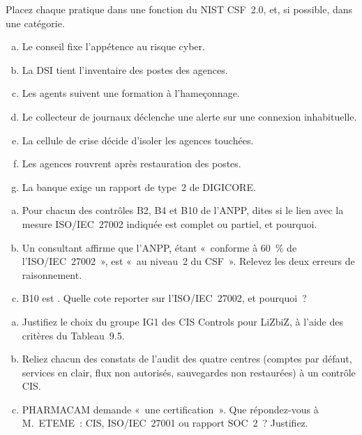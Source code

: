 \begin{boxexo}[title={\ding{45}\quad Exercice~9.1. Quelle fonction du CSF~? \niveaubase}]
Placez chaque pratique dans une fonction du NIST CSF~2.0, et, si possible,
dans une catégorie.
\begin{enumerate}[(a)]
    \item Le conseil fixe l'appétence au risque cyber.
    \item La DSI tient l'inventaire des postes des agences.
    \item Les agents suivent une formation à l'hameçonnage.
    \item Le collecteur de journaux déclenche une alerte sur une connexion
          inhabituelle.
    \item La cellule de crise décide d'isoler les agences touchées.
    \item Les agences rouvrent après restauration des postes.
    \item La banque exige un rapport de type~2 de DIGICORE.
\end{enumerate}
\end{boxexo}

\begin{boxexo}[title={\ding{45}\quad Exercice~9.2. Correspondances partielles \niveaumoyen}]
\begin{enumerate}[(a)]
    \item Pour chacun des contrôles B2, B4 et B10 de l'ANPP, dites si le lien
          avec la mesure ISO/IEC~27002 indiquée est complet ou partiel, et
          pourquoi.
    \item Un consultant affirme que l'ANPP, étant «~conforme à 60~\% de
          l'ISO/IEC~27002~», est «~au niveau~2 du CSF~». Relevez les deux
          erreurs de raisonnement.
    \item B10 est \OUI{}. Quelle cote reporter sur l'ISO/IEC~27002, et
          pourquoi~?
\end{enumerate}
\end{boxexo}

\begin{boxexo}[title={\ding{45}\quad Exercice~9.3. L'hygiène de base de LiZbiZ \niveaumoyen}]
\begin{enumerate}[(a)]
    \item Justifiez le choix du groupe IG1 des CIS Controls pour LiZbiZ, à
          l'aide des critères du Tableau~9.5.
    \item Reliez chacun des constats de l'audit des quatre centres (comptes
          par défaut, services en clair, flux non autorisés, sauvegardes non
          restaurées) à un contrôle CIS.
    \item PHARMACAM demande «~une certification~». Que répondez-vous à
          M.~ETEME~: CIS, ISO/IEC~27001 ou rapport SOC~2~? Justifiez.
\end{enumerate}
\end{boxexo}

